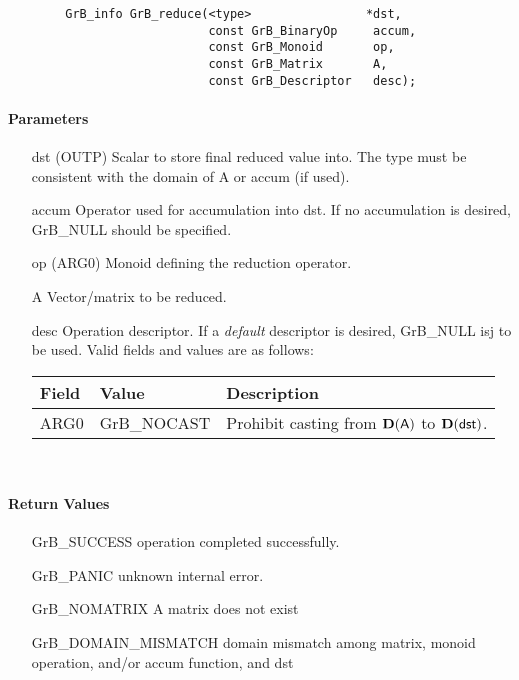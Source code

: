 \begin{verbatim}
        GrB_info GrB_reduce(<type>                *dst,
                            const GrB_BinaryOp     accum,
                            const GrB_Monoid       op,
                            const GrB_Matrix       A,
                            const GrB_Descriptor   desc);
\end{verbatim}


\paragraph{Parameters}

\begin{itemize}[leftmargin=1.1in]
    \item[{\sf dst}]    ({\sf OUTP}) Scalar to store final reduced value into.  The type must be
                        consistent with the domain of {\sf A} or {\sf accum} (if used).

    \item[{\sf accum}]  Operator used for accumulation into {\sf dst}.  If no accumulation
                        is desired, {\sf GrB\_NULL} should be specified.

    \item[{\sf op}]     ({\sf ARG0}) Monoid defining the reduction operator.
    \item[{\sf A}]    Vector/matrix to be reduced.

    \item[{\sf desc}]   Operation descriptor. If a
    \emph{default} descriptor is desired, {\sf GrB\_NULL} isj to be
    used.  Valid fields and values are as follows: \\
    \begin{tabular}{lll}
    Field  & Value & Description \\
    \hline
    {\sf ARG0} & {\sf GrB\_NOCAST} & Prohibit casting from $\bold{D}({\sf A})$ to 
    $\bold{D}({\sf dst})$.  \\
    \end{tabular}\\
\end{itemize}

\paragraph{Return Values}

\begin{itemize}[leftmargin=2.1in]
\item[{\sf GrB\_SUCCESS}]             operation completed successfully.
\item[{\sf GrB\_PANIC}]               unknown internal error.
\item[{\sf GrB\_NOMATRIX}]   {\sf A} matrix does not exist
\item[{\sf GrB\_DOMAIN\_MISMATCH}]  
        domain mismatch among matrix, monoid operation, and/or
        accum function, and {\sf dst} 
\end{itemize}

